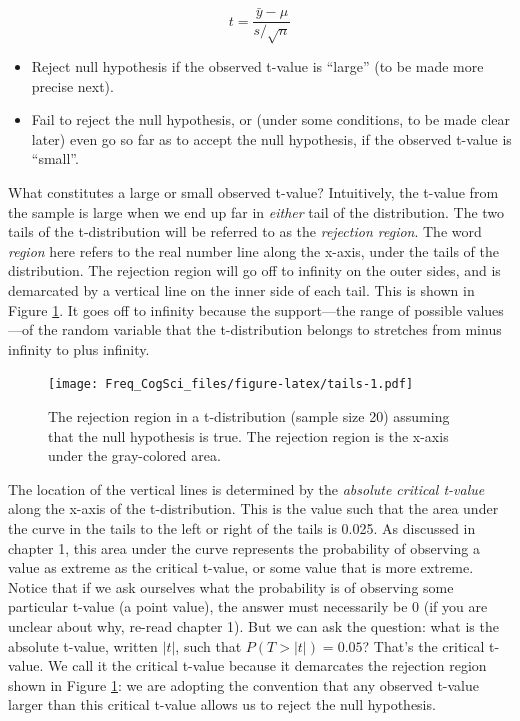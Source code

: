 \documentclass[
  12pt,
]{krantz}
\providecommand{\tightlist}{%
  \setlength{\itemsep}{0pt}\setlength{\parskip}{0pt}}
\theoremstyle{definition}
\theoremstyle{definition}
\theoremstyle{definition}
\theoremstyle{definition}
\theoremstyle{remark}
\begin{document}
\begin{equation}
t=\frac{\bar{y}-\mu}{s/\sqrt{n}}
\end{equation}

\begin{itemize}
\tightlist
\item
  Reject null hypothesis if the observed t-value is ``large'' (to be made more precise next).
\item
  Fail to reject the null hypothesis, or (under some conditions, to be made clear later) even go so far as to accept the null hypothesis, if the observed t-value is ``small''.
\end{itemize}

What constitutes a large or small observed t-value?
Intuitively, the t-value from the sample is large when we end up far in \emph{either} tail of the distribution. The two tails of the t-distribution will be referred to as the \emph{rejection region}. The word \emph{region} here refers to the real number line along the x-axis, under the tails of the distribution. The rejection region will go off to infinity on the outer sides, and is demarcated by a vertical line on the inner side of each tail. This is shown in Figure \ref{fig:tails}. It goes off to infinity because the support---the range of possible values---of the random variable that the t-distribution belongs to stretches from minus infinity to plus infinity.

\begin{figure}
\centering
\texttt{[image: Freq\_CogSci\_files/figure-latex/tails-1.pdf]}
\caption{\label{fig:tails}The rejection region in a t-distribution (sample size 20) assuming that the null hypothesis is true. The rejection region is the x-axis under the gray-colored area.}
\end{figure}

The location of the vertical lines is determined by the \emph{absolute critical t-value} along the x-axis of the t-distribution. This is the value such that the area under the curve in the tails to the left or right of the tails is 0.025. As discussed in chapter 1, this area under the curve represents the probability of observing a value as extreme as the critical t-value, or some value that is more extreme. Notice that if we ask ourselves what the probability is of observing some particular t-value (a point value), the answer must necessarily be \(0\) (if you are unclear about why, re-read chapter 1). But we can ask the question: what is the absolute t-value, written \(|t|\), such that \(P(T>|t|)=0.05\)? That's the critical t-value. We call it the critical t-value because it demarcates the rejection region shown in Figure \ref{fig:tails}: we are adopting the convention that any observed t-value larger than this critical t-value allows us to reject the null hypothesis.
\end{document}
